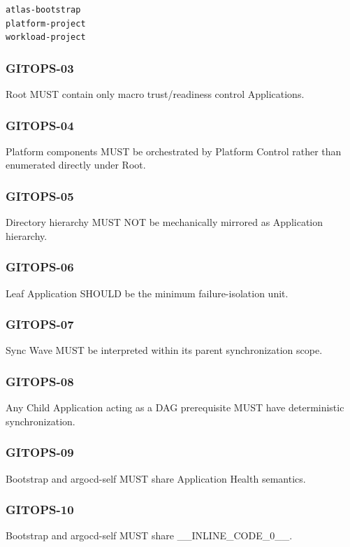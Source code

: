 \documentclass[11pt,a4paper]{article}
\begin{document}
\begin{lstlisting}[language=text]
atlas-bootstrap
platform-project
workload-project
\end{lstlisting}
\subsubsection{GITOPS-03}
Root MUST contain only macro trust/readiness control Applications.

\subsubsection{GITOPS-04}
Platform components MUST be orchestrated by Platform Control rather than enumerated directly under Root.

\subsubsection{GITOPS-05}
Directory hierarchy MUST NOT be mechanically mirrored as Application hierarchy.

\subsubsection{GITOPS-06}
Leaf Application SHOULD be the minimum failure-isolation unit.

\subsubsection{GITOPS-07}
Sync Wave MUST be interpreted within its parent synchronization scope.

\subsubsection{GITOPS-08}
Any Child Application acting as a DAG prerequisite MUST have deterministic synchronization.

\subsubsection{GITOPS-09}
Bootstrap and argocd-self MUST share Application Health semantics.

\subsubsection{GITOPS-10}
Bootstrap and argocd-self MUST share \_\_INLINE\_CODE\_0\_\_.
\end{document}
